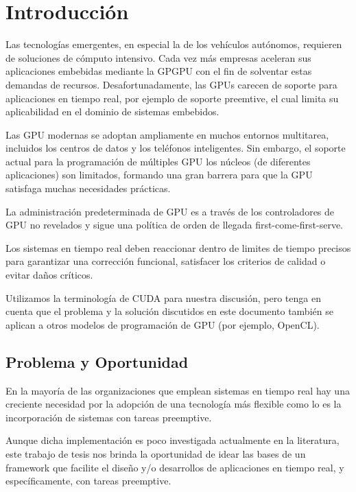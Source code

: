 

\chapter{Introducción}
\label{cha:Introducción}

\graphicspath{{figures/}}

Las tecnologías emergentes, en especial la de los vehículos autónomos, requieren de soluciones de cómputo intensivo. Cada vez más empresas aceleran sus aplicaciones embebidas mediante la GPGPU con el fin de solventar estas demandas de recursos. Desafortunadamente, las GPUs carecen de soporte para aplicaciones en tiempo real, por ejemplo de soporte preemtive, el cual limita su aplicabilidad en el dominio de sistemas embebidos.

Las GPU modernas se adoptan ampliamente en muchos entornos multitarea, incluidos los centros de datos y los teléfonos inteligentes. Sin embargo, el soporte actual para la programación de múltiples GPU
los núcleos (de diferentes aplicaciones) son limitados, formando una gran barrera para que la GPU satisfaga muchas necesidades prácticas.

La administración predeterminada de GPU es a través de los controladores de GPU no revelados y sigue una política de orden de llegada first-come-first-serve.

Los sistemas en tiempo real deben reaccionar dentro de limites de tiempo precisos para garantizar una corrección funcional, satisfacer los criterios de calidad o evitar daños críticos.

Utilizamos la terminología de CUDA para nuestra discusión, pero tenga en cuenta que el problema y la solución discutidos en este documento también se aplican a otros modelos de programación de GPU (por ejemplo, OpenCL).



\section{Problema y Oportunidad}
En la mayoría de las organizaciones que emplean sistemas en tiempo real hay una creciente necesidad por la adopción de una tecnología más flexible como lo es la incorporación de sistemas con tareas preemptive.

Aunque dicha implementación es poco investigada actualmente en la literatura, este trabajo de tesis nos brinda la oportunidad de idear las bases de un framework que facilite el diseño y/o desarrollos de aplicaciones en tiempo real, y específicamente, con tareas preemptive.

